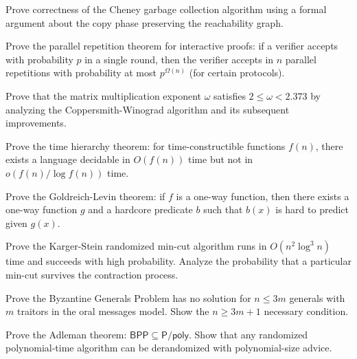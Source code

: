\documentclass[12pt,a4paper]{exam}
\begin{document}
\begin{questions}

\question[7]
Prove correctness of the Cheney garbage collection algorithm using a formal argument about the copy phase preserving the reachability graph.

\vspace{0.3cm}

\question[2]
Prove the parallel repetition theorem for interactive proofs: if a verifier accepts with probability $p$ in a single round, then the verifier accepts in $n$ parallel repetitions with probability at most $p^{\Omega(n)}$ (for certain protocols).

\vspace{0.3cm}

\question[3]
Prove that the matrix multiplication exponent $\omega$ satisfies $2 \leq \omega < 2.373$ by analyzing the Coppersmith-Winograd algorithm and its subsequent improvements.

\vspace{0.3cm}

\question[5]
Prove the time hierarchy theorem: for time-constructible functions $f(n)$, there exists a language decidable in $O(f(n))$ time but not in $o(f(n)/\log f(n))$ time.

\vspace{0.3cm}

\question[4]
Prove the Goldreich-Levin theorem: if $f$ is a one-way function, then there exists a one-way function $g$ and a hardcore predicate $b$ such that $b(x)$ is hard to predict given $g(x)$.

\vspace{0.3cm}

\question[3]
Prove the Karger-Stein randomized min-cut algorithm runs in $O(n^2 \log^3 n)$ time and succeeds with high probability. Analyze the probability that a particular min-cut survives the contraction process.

\vspace{0.3cm}

\question[4]
Prove the Byzantine Generals Problem has no solution for $n \leq 3m$ generals with $m$ traitors in the oral messages model. Show the $n \geq 3m+1$ necessary condition.

\vspace{0.3cm}

\question[3]
Prove the Adleman theorem: $\mathsf{BPP} \subseteq \mathsf{P}/\mathsf{poly}$. Show that any randomized polynomial-time algorithm can be derandomized with polynomial-size advice.


\end{questions}
\end{document}
